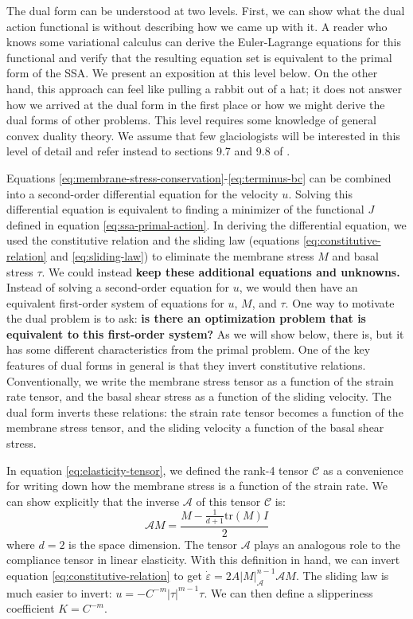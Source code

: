 \documentclass[review,oneside]{igs}
\begin{document}
The dual form can be understood at two levels.
First, we can show what the dual action functional is without describing how we came up with it.
A reader who knows some variational calculus can derive the Euler-Lagrange equations for this functional and verify that the resulting equation set is equivalent to the primal form of the SSA.
We present an exposition at this level below.
On the other hand, this approach can feel like pulling a rabbit out of a hat; it does not answer how we arrived at the dual form in the first place or how we might derive the dual forms of other problems.
This level requires some knowledge of general convex duality theory.
We assume that few glaciologists will be interested in this level of detail and refer instead to sections 9.7 and 9.8 of \citet{attouch2014variational}.

Equations \eqref{eq:membrane-stress-conservation}-\eqref{eq:terminus-bc} can be combined into a second-order differential equation for the velocity $u$.
Solving this differential equation is equivalent to finding a minimizer of the functional $J$ defined in equation \eqref{eq:ssa-primal-action}.
In deriving the differential equation, we used the constitutive relation and the sliding law (equations \eqref{eq:constitutive-relation} and \eqref{eq:sliding-law}) to eliminate the membrane stress $M$ and basal stress $\tau$.
We could instead \textbf{keep these additional equations and unknowns.}
Instead of solving a second-order equation for $u$, we would then have an equivalent first-order system of equations for $u$, $M$, and $\tau$.
One way to motivate the dual problem is to ask: \textbf{is there an optimization problem that is equivalent to this first-order system?}
As we will show below, there is, but it has some different characteristics from the primal problem.
One of the key features of dual forms in general is that they invert constitutive relations.
Conventionally, we write the membrane stress tensor as a function of the strain rate tensor, and the basal shear stress as a function of the sliding velocity.
The dual form inverts these relations: the strain rate tensor becomes a function of the membrane stress tensor, and the sliding velocity a function of the basal shear stress.

In equation \eqref{eq:elasticity-tensor}, we defined the rank-4 tensor $\mathscr{C}$ as a convenience for writing down how the membrane stress is a function of the strain rate.
We can show explicitly that the inverse $\mathscr{A}$ of this tensor $\mathscr{C}$ is:
\begin{equation}
    \mathscr{A}M = \frac{M - \frac{1}{d + 1}\text{tr}(M)I}{2}
\end{equation}
where $d = 2$ is the space dimension.
The tensor $\mathscr{A}$ plays an analogous role to the compliance tensor in linear elasticity.
With this definition in hand, we can invert equation \eqref{eq:constitutive-relation} to get $\dot\varepsilon = 2A|M|_{\mathscr{A}}^{n - 1}\mathscr{A}M$.
The sliding law is much easier to invert: $u = -C^{-m}|\tau|^{m - 1}\tau$.
We can then define a slipperiness coefficient $K = C^{-m}$.
\end{document}

